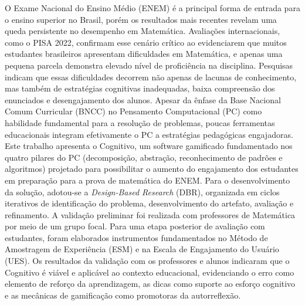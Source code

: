 O Exame Nacional do Ensino Médio (ENEM) é a principal forma de entrada para o
ensino superior no Brasil, porém os resultados mais recentes revelam uma queda
persistente no desempenho em Matemática. Avaliações internacionais, como o PISA
2022, confirmam esse cenário crítico ao evidenciarem que muitos estudantes
brasileiros apresentam dificuldades em Matemática, e apenas uma pequena parcela
demonstra elevado nível de proficiência na disciplina. Pesquisas indicam que
essas dificuldades decorrem não apenas de lacunas de conhecimento, mas também de
estratégias cognitivas inadequadas, baixa compreensão dos enunciados e
desengajamento dos alunos. Apesar da ênfase da Base Nacional Comum Curricular (BNCC) no
Pensamento Computacional (PC) como habilidade fundamental para a resolução de
problemas, poucas ferramentas educacionais integram efetivamente o PC a
estratégias pedagógicas engajadoras. Este trabalho apresenta o Cognitivo, um
software gamificado fundamentado nos quatro pilares do PC (decomposição,
abstração, reconhecimento de padrões e algoritmos) projetado para possibilitar o
aumento do engajamento dos estudantes em preparação para a prova de matemática
do ENEM. Para o desenvolvimento da solução, adotou-se a \textit{Design-Based
Research} (DBR), organizada em ciclos iterativos de identificação do problema,
desenvolvimento do artefato, avaliação e refinamento. A validação preliminar foi realizada
com professores de Matemática por meio de um grupo focal. Para uma etapa posterior de avaliação com
estudantes, foram elaborados instrumentos fundamentados no Método de Amostragem de Experiência (ESM) e na
Escala de Engajamento do Usuário (UES). Os resultados da validação com os
professores e alunos indicaram que o Cognitivo é viável e aplicável ao contexto
educacional, evidenciando o erro como elemento de reforço da aprendizagem, as
dicas como suporte ao esforço cognitivo e as mecânicas de gamificação como
promotoras da autorreflexão.

